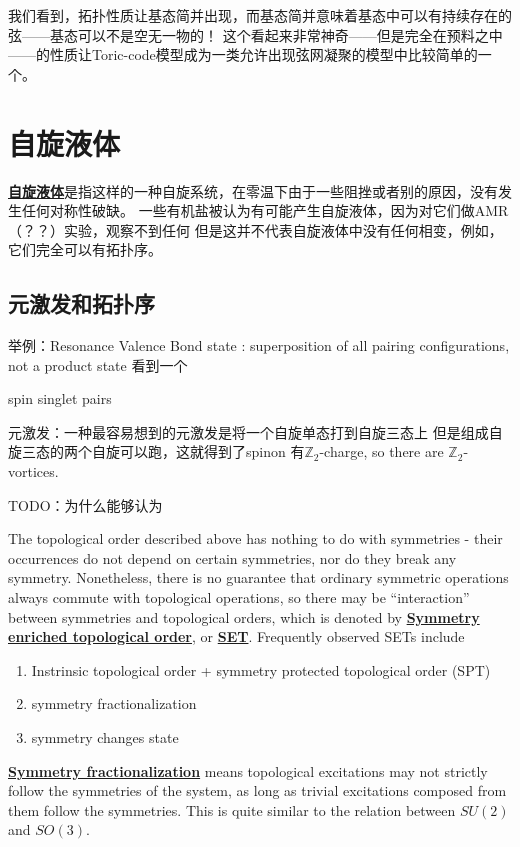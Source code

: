 \documentclass[hyperref, UTF8, a4paper]{ctexart}
\newcommand*{\concept}[1]{\underline{\textbf{#1}}}
\begin{document}
我们看到，拓扑性质让基态简并出现，而基态简并意味着基态中可以有持续存在的弦——基态可以不是空无一物的！
这个看起来非常神奇——但是完全在预料之中——的性质让Toric-code模型成为一类允许出现弦网凝聚的模型中比较简单的一个。

\section{自旋液体}

\concept{自旋液体}是指这样的一种自旋系统，在零温下由于一些阻挫或者别的原因，没有发生任何对称性破缺。
一些有机盐被认为有可能产生自旋液体，因为对它们做AMR（？？）实验，观察不到任何
但是这并不代表自旋液体中没有任何相变，例如，它们完全可以有拓扑序。

\subsection{元激发和拓扑序}

举例：Resonance Valence Bond state : superposition of all pairing configurations, not a product state
看到一个

spin singlet pairs

元激发：一种最容易想到的元激发是将一个自旋单态打到自旋三态上 但是组成自旋三态的两个自旋可以跑，这就得到了spinon
有$\mathbb{Z}_2$-charge, so there are $\mathbb{Z}_2$-vortices.

TODO：为什么能够认为

The topological order described above has nothing to do with symmetries - their occurrences do not depend on certain symmetries, nor do they break any symmetry.
Nonetheless, there is no guarantee that ordinary symmetric operations always commute with topological operations, so there may be ``interaction'' between symmetries and topological orders, which is denoted by \concept{Symmetry enriched topological order}, or \concept{SET}.
Frequently observed SETs include
\begin{enumerate}
    \item Instrinsic topological order + symmetry protected topological order (SPT)
    \item symmetry fractionalization
    \item symmetry changes state
\end{enumerate}

\concept{Symmetry fractionalization} means topological excitations may not strictly follow the symmetries of the system, as long as trivial excitations composed from them follow the symmetries.
This is quite similar to the relation between $SU(2)$ and $SO(3)$.
\end{document}
